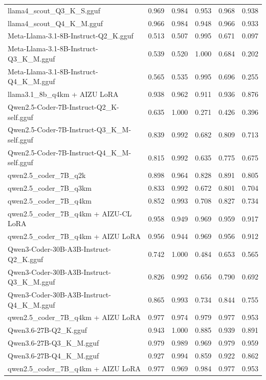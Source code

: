 \begin{table}[htbp]
{\begin{tabular}{lrrrrr}
    llama4\_scout\_Q3\_K\_S.gguf & 0.969 & 0.984 & 0.953 & 0.968 & 0.938 \\
    llama4\_scout\_Q4\_K\_M.gguf & 0.966 & 0.984 & 0.948 & 0.966 & 0.933 \\
    Meta-Llama-3.1-8B-Instruct-Q2\_K.gguf & 0.513 & 0.507 & 0.995 & 0.671 & 0.097 \\
    Meta-Llama-3.1-8B-Instruct-Q3\_K\_M.gguf & 0.539 & 0.520 & 1.000 & 0.684 & 0.202 \\
    Meta-Llama-3.1-8B-Instruct-Q4\_K\_M.gguf & 0.565 & 0.535 & 0.995 & 0.696 & 0.255 \\
    llama3.1\_8b\_q4km + AIZU LoRA & 0.938 & 0.962 & 0.911 & 0.936 & 0.876 \\
    Qwen2.5-Coder-7B-Instruct-Q2\_K-self.gguf & 0.635 & 1.000 & 0.271 & 0.426 & 0.396 \\
    Qwen2.5-Coder-7B-Instruct-Q3\_K\_M-self.gguf & 0.839 & 0.992 & 0.682 & 0.809 & 0.713 \\
    Qwen2.5-Coder-7B-Instruct-Q4\_K\_M-self.gguf & 0.815 & 0.992 & 0.635 & 0.775 & 0.675 \\
    qwen2.5\_coder\_7B\_q2k & 0.898 & 0.964 & 0.828 & 0.891 & 0.805 \\
    qwen2.5\_coder\_7B\_q3km & 0.833 & 0.992 & 0.672 & 0.801 & 0.704 \\
    qwen2.5\_coder\_7B\_q4km & 0.852 & 0.993 & 0.708 & 0.827 & 0.734 \\
    qwen2.5\_coder\_7B\_q4km + AIZU-CL LoRA & 0.958 & 0.949 & 0.969 & 0.959 & 0.917 \\
    qwen2.5\_coder\_7B\_q4km + AIZU LoRA & 0.956 & 0.944 & 0.969 & 0.956 & 0.912 \\
    Qwen3-Coder-30B-A3B-Instruct-Q2\_K.gguf & 0.742 & 1.000 & 0.484 & 0.653 & 0.565 \\
    Qwen3-Coder-30B-A3B-Instruct-Q3\_K\_M.gguf & 0.826 & 0.992 & 0.656 & 0.790 & 0.692 \\
    Qwen3-Coder-30B-A3B-Instruct-Q4\_K\_M.gguf & 0.865 & 0.993 & 0.734 & 0.844 & 0.755 \\
    qwen2.5\_coder\_7B\_q4km + AIZU LoRA & 0.977 & 0.974 & 0.979 & 0.977 & \cellcolor{green!30}0.953 \\
    Qwen3.6-27B-Q2\_K.gguf & 0.943 & 1.000 & 0.885 & 0.939 & 0.891 \\
    Qwen3.6-27B-Q3\_K\_M.gguf & 0.979 & 0.989 & 0.969 & 0.979 & \cellcolor{green!50}0.959 \\
    Qwen3.6-27B-Q4\_K\_M.gguf & 0.927 & 0.994 & 0.859 & 0.922 & 0.862 \\
    qwen2.5\_coder\_7B\_q4km + AIZU LoRA & 0.977 & 0.969 & 0.984 & 0.977 & \cellcolor{green!40}0.953 \\

\end{tabular}}
\end{table}
